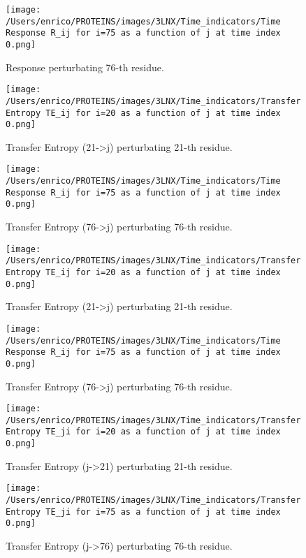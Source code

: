 \documentclass[English, Lau, oneside]{sapthesis}
\begin{document}
\begin{itemize}
\begin{figure}[h!]
    \centering
    \texttt{[image: /Users/enrico/PROTEINS/images/3LNX/Time\_indicators/Time Response R\_ij for i=75 as a function of j at time index 0.png]}
    \caption{Response perturbating 76-th residue.}
\end{figure}

\begin{figure}[h!]
    \centering
    \texttt{[image: /Users/enrico/PROTEINS/images/3LNX/Time\_indicators/Transfer Entropy TE\_ij for i=20 as a function of j at time index 0.png]}
    \caption{Transfer Entropy (21->j) perturbating 21-th residue.}
\end{figure}
\begin{figure}[h!]
    \centering
    \texttt{[image: /Users/enrico/PROTEINS/images/3LNX/Time\_indicators/Time Response R\_ij for i=75 as a function of j at time index 0.png]}
    \caption{Transfer Entropy (76->j) perturbating 76-th residue.}
\end{figure}


\begin{figure}[h!]
    \centering
    \texttt{[image: /Users/enrico/PROTEINS/images/3LNX/Time\_indicators/Transfer Entropy TE\_ij for i=20 as a function of j at time index 0.png]}
    \caption{Transfer Entropy (21->j) perturbating 21-th residue.}
\end{figure}
\begin{figure}[h!]
    \centering
    \texttt{[image: /Users/enrico/PROTEINS/images/3LNX/Time\_indicators/Time Response R\_ij for i=75 as a function of j at time index 0.png]}
    \caption{Transfer Entropy (76->j) perturbating 76-th residue.}
\end{figure}


\begin{figure}[h!]
    \centering
    \texttt{[image: /Users/enrico/PROTEINS/images/3LNX/Time\_indicators/Transfer Entropy TE\_ji for i=20 as a function of j at time index 0.png]}
    \caption{Transfer Entropy (j->21) perturbating 21-th residue.}
\end{figure}
\begin{figure}[h!]
    \centering
    \texttt{[image: /Users/enrico/PROTEINS/images/3LNX/Time\_indicators/Transfer Entropy TE\_ji for i=75 as a function of j at time index 0.png]}
    \caption{Transfer Entropy (j->76) perturbating 76-th residue.}
\end{figure}


\end{itemize}
\end{document}
